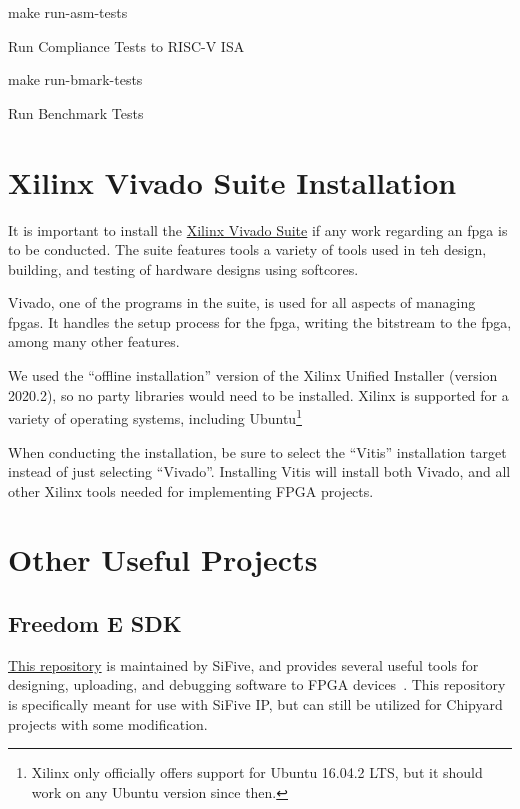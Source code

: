 \begin{listing}[h!tbp]
\begin{bashsource}
make run-asm-tests
\end{bashsource}
\caption{Run Compliance Tests to RISC-V ISA}
\label{lst:ASM_Tests}
\end{listing}

\begin{listing}[h!tbp]
\begin{bashsource}
make run-bmark-tests
\end{bashsource}
\caption{Run Benchmark Tests}
\label{lst:Run_Benchmark_Tests}
\end{listing}

\section{Xilinx Vivado Suite Installation}\label{sec:Xilinx_Vivado_Suide_Install}
It is important to install the \href{https://www.xilinx.com/support/download.html}{Xilinx Vivado Suite} if any work regarding an \Gls{fpga} is to be conducted.
The suite features tools a variety of tools used in teh design, building, and testing of hardware designs using \glspl{softcore}.

Vivado, one of the programs in the suite, is used for all aspects of managing \Glspl{fpga}.
It handles the setup process for the \Gls{fpga}, writing the bitstream to the \Gls{fpga}, among many other features.

We used the ``offline installation'' version of the Xilinx Unified Installer (version 2020.2), so no  party libraries would need to be installed.
Xilinx is supported for a variety of operating systems, including Ubuntu\footnote{Xilinx only officially offers support for Ubuntu 16.04.2 LTS, but it should work on any Ubuntu version since then.}

When conducting the installation, be sure to select the ``Vitis'' installation target instead of just selecting ``Vivado''.
Installing Vitis will install both Vivado, and all other Xilinx tools needed for implementing FPGA projects.

\section{Other Useful Projects}\label{sec:Other_Useful_Projects}
\subsection{Freedom E SDK}\label{sec:Freedom_E_SDK}
\href{https://github.com/sifive/freedom-e-sdk}{This repository} is maintained by SiFive, and provides several useful tools for designing, uploading, and debugging software to FPGA devices~\cite{freedomESDK}.
This repository is specifically meant for use with SiFive IP, but can still be utilized for Chipyard projects with some modification.

